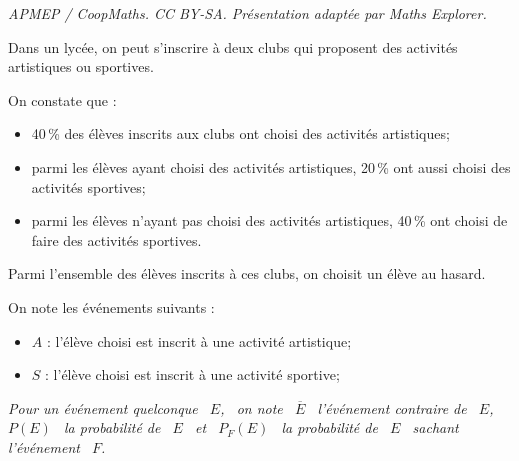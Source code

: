 \documentclass[10pt]{article}
\begin{document}
\noindent\textit{APMEP / CoopMaths. CC BY-SA. Présentation adaptée par Maths Explorer.}\par\medskip
Dans un lycée, on peut s'inscrire à deux clubs qui proposent des activités artistiques ou sportives.

On constate que :
\begin{itemize}[label=$\bullet$]
	\item 40\,\% des élèves inscrits aux clubs ont choisi des activités artistiques;
	\item parmi les élèves ayant choisi des activités artistiques, 20\,\% ont aussi choisi des activités sportives;
	\item parmi les élèves n'ayant pas choisi des activités artistiques, 40\,\% ont choisi de faire des activités sportives.
\end{itemize}

Parmi l'ensemble des élèves inscrits à ces clubs, on choisit un élève au hasard.

On note les événements suivants :

\begin{itemize}[label=$\bullet$]
\item $A$ : \og{}l'élève choisi est inscrit à une activité artistique\fg{};

\item $S$ :  \og{}l'élève choisi est inscrit à une activité sportive\fg{};
\end{itemize}

\emph{Pour un événement quelconque ~$E$,~ on note ~$\overline{E}$~ l'événement contraire de ~$E$,~ $P(E)$~ la probabilité de ~$E$~ et ~$P_F (E)$~ la probabilité de ~$E$~ sachant l'événement ~$F$.}
\end{document}
